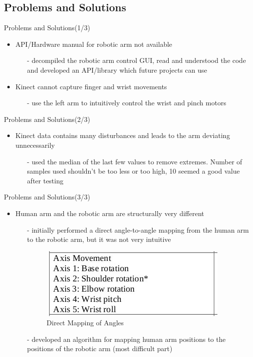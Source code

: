 \documentclass{beamer}
\begin{document}
\subsection{Problems and Solutions}
\begin{frame}{Problems and Solutions(1/3)}
\begin{itemize}
\item API/Hardware manual for robotic arm not available
\begin{itemize}
\item[-] decompiled the robotic arm control GUI, read and understood the code and developed an API/library which future projects can use
\end{itemize}
\item Kinect cannot capture finger and wrist movements
\begin{itemize}
\item[-] use the left arm to intuitively control the wrist and pinch motors
\end{itemize}
\end{itemize}
\end{frame}   

\begin{frame}{Problems and Solutions(2/3)}
\begin{itemize}
\item Kinect data contains many disturbances and leads to the arm deviating unnecessarily
\begin{itemize}
\item[-] used the median of the last few values to remove extremes. Number of samples used shouldn't be too less or too high, 10 seemed a good value after testing
\end{itemize}
\end{itemize}
\end{frame}   

\begin{frame}{Problems and Solutions(3/3)}
\begin{itemize}
\item Human arm and the robotic arm are structurally very different
\begin{itemize}
\item[-] initially performed a direct angle-to-angle mapping from the human arm to the robotic arm, but it was not very intuitive
\begin{figure}
\centerline{\includegraphics[scale=0.4]{images/arm-axes-table.jpg}}
\caption{Direct Mapping of Angles}
\end{figure}
\item[-] developed an algorithm for mapping human arm positions to the positions of the robotic arm (most difficult part)
\end{itemize}
\end{itemize}

\end{frame}
\end{document}
